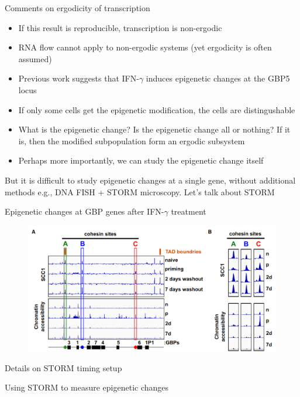 \documentclass[aspectratio=1610]{beamer}					%
\begin{document}
\begin{frame}{Comments on ergodicity of transcription}
\vspace{0.1in}
\begin{itemize}
\item If this result is reproducible, transcription is non-ergodic
\item RNA flow cannot apply to non-ergodic systems (yet ergodicity is often assumed)
\item Previous work suggests that IFN-$\gamma$ induces epigenetic changes at the GBP5 locus
\item If only some cells get the epigenetic modification, the cells are distingushable
\item What is the epigenetic change? Is the epigenetic change all or nothing? If it is, then the modified subpopulation form an ergodic subsystem
\item Perhaps more importantly, we can study the epigenetic change itself
\end{itemize}
\vspace{0.1in}
But it is difficult to study epigenetic changes at a single gene, without additional methods e.g., DNA FISH + STORM microscopy. Let's talk about STORM

\end{frame}

\begin{frame}{Epigenetic changes at GBP genes after IFN-$\gamma$ treatment}
\begin{figure}
\includegraphics[width=14cm]{Epigenetic.png}
\end{figure}
\end{frame}

\begin{frame}{Details on STORM timing setup}

\end{frame}

\begin{frame}{Using STORM to measure epigenetic changes}

\end{frame}
\end{document}
